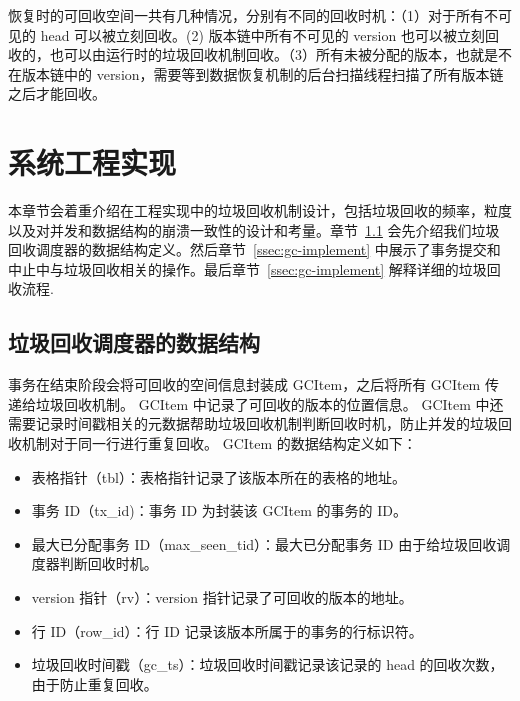 恢复时的可回收空间一共有几种情况，分别有不同的回收时机：（1）对于所有不可见的 head 可以被立刻回收。(2) 版本链中所有不可见的 version 也可以被立刻回收的，也可以由运行时的垃圾回收机制回收。（3）所有未被分配的版本，也就是不在版本链中的 version，需要等到数据恢复机制的后台扫描线程扫描了所有版本链之后才能回收。


\section{系统工程实现}
\label{sec:implement}

本章节会着重介绍在工程实现中的垃圾回收机制设计，包括垃圾回收的频率，粒度以及对并发和数据结构的崩溃一致性的设计和考量。章节~\ref{ssec:gc-metadata} 会先介绍我们垃圾回收调度器的数据结构定义。然后章节~\ref{ssec:gc-implement} 中展示了事务提交和中止中与垃圾回收相关的操作。最后章节~\ref{ssec:gc-implement} 解释详细的垃圾回收流程.

\subsection{垃圾回收调度器的数据结构}
\label{ssec:gc-metadata}


事务在结束阶段会将可回收的空间信息封装成 GCItem，之后将所有 GCItem 传递给垃圾回收机制。
GCItem 中记录了可回收的版本的位置信息。
GCItem 中还需要记录时间戳相关的元数据帮助垃圾回收机制判断回收时机，防止并发的垃圾回收机制对于同一行进行重复回收。
GCItem 的数据结构定义如下：
\begin{itemize}
    \item 表格指针（tbl）：表格指针记录了该版本所在的表格的地址。
    \item 事务 ID（tx\_id)：事务 ID 为封装该 GCItem 的事务的 ID。
    \item 最大已分配事务 ID（max\_seen\_tid）：最大已分配事务 ID 由于给垃圾回收调度器判断回收时机。
    \item version 指针（rv）：version 指针记录了可回收的版本的地址。
    \item 行 ID（row\_id）：行 ID 记录该版本所属于的事务的行标识符。
    \item 垃圾回收时间戳（gc\_ts）：垃圾回收时间戳记录该记录的 head 的回收次数，由于防止重复回收。
\end{itemize}


